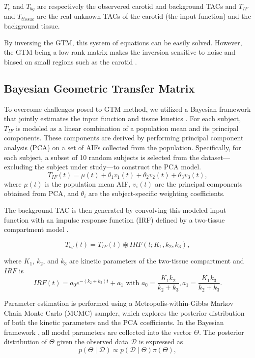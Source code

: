 $T_{c}$ and $T_{bg}$ are respectively the observered carotid and background TACs and $T_{IF}$ and $T_{tissue}$ are the real unknown TACs of the carotid (the input function) and the background tissue.

By inversing the GTM, this system of equations can be easily solved.
However, the GTM being a low rank matrix makes the inversion sensitive to noise and biased on small regions such as the carotid \cite{zanotti2011image, boellaard2004effects}.

\subsection{Bayesian Geometric Transfer Matrix}
To overcome challenges posed to GTM method, we utilized a Bayesian framework that jointly estimates the input function and tissue kinetics \cite{irace2021bayesian}.
For each subject, $T_{IF}$ is modeled as a linear combination of a population mean and its principal components.
These components are derived by performing principal component analysis (PCA) on a set of AIFs collected from the population. Specifically, for each subject, a subset of 10 random subjects is selected from the dataset—excluding the subject under study—to construct the PCA model.
\begin{equation}
	T_{IF}(t) = \mu(t) + \theta_{1} v_{1}(t) + \theta_{2} v_{2}(t) + \theta_{3} v_{3}(t),
\end{equation}
where \(\mu(t)\) is the population mean AIF, \(v_{i}(t)\) are the principal components obtained from PCA, and \(\theta_{i}\) are the subject-specific weighting coefficients.

The background TAC is then generated by convolving this modeled input function with an impulse response function (IRF) defined by a two-tissue compartment model \cite{jouvie2013estimation}.

\begin{equation}
	T_{bg}(t) = T_{IF}(t) \circledast IRF(t; K_1, k_2, k_3),
\end{equation}

where $K_1$, $k_2$, and $k_3$ are kinetic parameters of the two-tissue compartment and $IRF$ is
\begin{equation}
	IRF(t) = a_0 e^{-(k_2+k_3)t} + a_1\text{ with } a_0= \frac{K_1 k_2}{k_2+k_3}, a_1= \frac{K_1 k_3}{k_2+k_3}.
\end{equation}

Parameter estimation is performed using a Metropolis-within-Gibbs Markov Chain Monte Carlo (MCMC) sampler, which explores the posterior distribution of both the kinetic parameters and the PCA coefficients.
In the Bayesian framework \cite{irace2021bayesian}, all model parameters are collected into the vector $\Theta$. The posterior distribution of $\Theta$ given the observed data $\mathcal{D}$ is expressed as
\begin{equation}
	p(\Theta \mid \mathcal{D}) \propto p(\mathcal{D} \mid \Theta) \pi(\Theta),
\end{equation}

